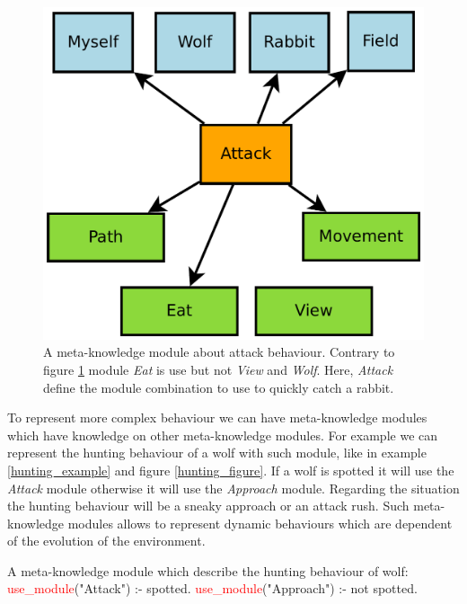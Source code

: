 \documentclass{aamas2012}
\begin{document}
	\begin{figure}
		\centering
		\includegraphics[keepaspectratio=true, scale=0.3]{attack_behaviour.pdf}
		\caption
		{
			\label{approach_figure}
			A meta-knowledge module about attack behaviour.
			Contrary to figure \ref{approach_figure} module \textit{Eat} is use but not \textit{View} and \textit{Wolf}.
			Here, \textit{Attack} define the module combination to use to quickly catch a rabbit.
		}
	\end{figure}
	
	To represent more complex behaviour we can have meta-knowledge modules which have knowledge on other meta-knowledge modules.
	For example we can represent the hunting behaviour of a wolf with such module, like in example \ref{hunting_example} and figure \ref{hunting_figure}.
	If a wolf is spotted it will use the \textit{Attack} module otherwise it will use the \textit{Approach} module.
	Regarding the situation the hunting behaviour will be a sneaky approach or an attack rush.
	Such meta-knowledge modules allows to represent dynamic behaviours which are dependent of the evolution of the environment.
	
	\begin{example}
		\label{hunting_example}
		A meta-knowledge module which describe the hunting behaviour of wolf:\newline
		\newline
		\textcolor{red}{use\_module}("Attack") :- spotted.\newline
		\textcolor{red}{use\_module}("Approach") :- not spotted.\newline
	\end{example}
	
\end{document}
